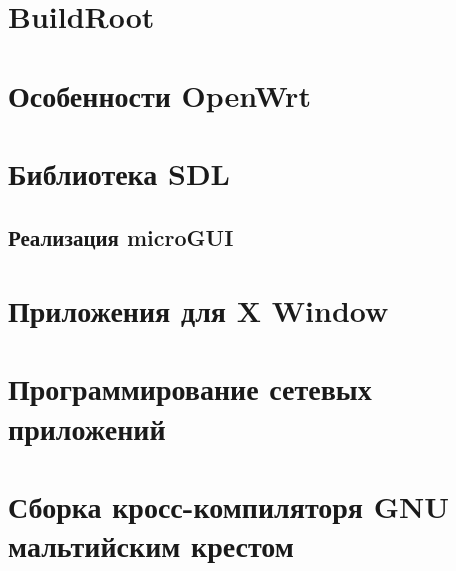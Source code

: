 \chapter{BuildRoot}

\chapter{Особенности OpenWrt}

\chapter{Библиотека SDL}

\section{Реализация microGUI}

\chapter{Приложения для X Window}

\chapter{Программирование сетевых приложений}

\chapter{Сборка кросс-компиляторя GNU мальтийским крестом}









\printbibliography


